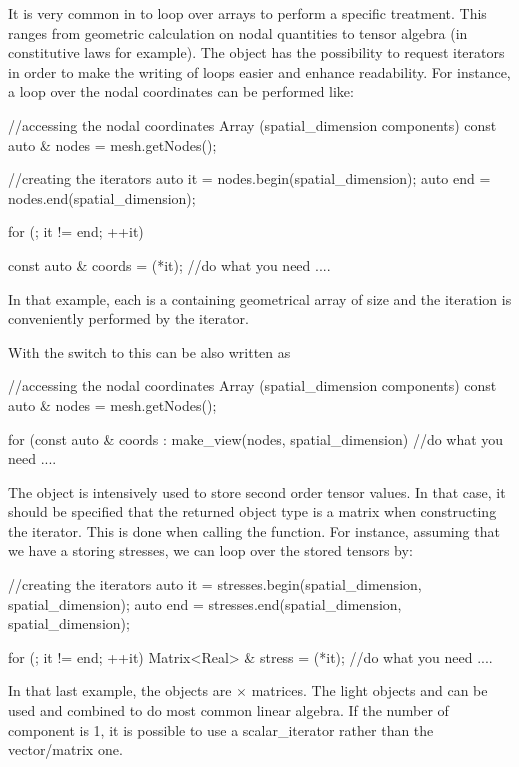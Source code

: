 It is very common in \akantu to loop over arrays to perform a specific
treatment. This ranges from geometric calculation on nodal quantities
to tensor algebra (in constitutive laws for example).
The  object has the possibility to request iterators
in order to make the writing of loops easier and enhance readability.
For instance, a loop over the nodal coordinates can be performed like:
\begin{cpp}
  //accessing the nodal coordinates Array (spatial_dimension components)
  const auto & nodes = mesh.getNodes();

  //creating the iterators
  auto it  = nodes.begin(spatial_dimension);
  auto end = nodes.end(spatial_dimension);

  for (; it != end; ++it){
    const auto & coords = (*it);
    //do what you need
    ....

  }
\end{cpp}
In that example, each  is a  containing
geometrical array of size  and the iteration is
conveniently performed by the  iterator.

With the switch to  this can be also written as
\begin{cpp}
  //accessing the nodal coordinates Array (spatial_dimension components)
  const auto & nodes = mesh.getNodes();

  for (const auto & coords : make_view(nodes, spatial_dimension) {
    //do what you need
    ....
  }
\end{cpp}

The  object is intensively used to store second order
tensor values.  In that case, it should be specified that the returned
object type is a matrix when constructing the iterator. This is done
when calling the  function. For instance, assuming that we
have a  storing stresses, we can loop over the stored
tensors by:

\begin{cpp}
  //creating the iterators
  auto it = stresses.begin(spatial_dimension, spatial_dimension);
  auto end = stresses.end(spatial_dimension, spatial_dimension);

  for (; it != end; ++it){
    Matrix<Real> & stress = (*it);
    //do what you need
    ....
  }
\end{cpp}
In that last example, the  objects are
 $\times$  matrices.
The light objects  and  can be used and
combined to do most common linear algebra. If the number of component
is 1, it is possible to use a scalar\_iterator rather than the
vector/matrix one.


